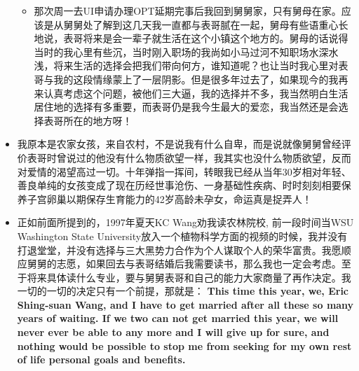 \documentclass[9pt, b5paper]{article}
\begin{document}
\begin{itemize}
\begin{itemize}
\item 那次周一去UI申请办理OPT延期完事后我回到舅舅家，只有舅母在家。应该是从舅舅处了解到这几天我一直都与表哥腻在一起，舅母有些语重心长地说，表哥将来是会一辈子就生活在这个小镇这个地方的。舅母的话说得当时的我心里有些沉，当时刚入职场的我尚如小马过河不知职场水深水浅，将来生活的选择会把我们带向何方，谁知道呢？也让当时我心里对表哥与我的这段情缘蒙上了一层阴影。但是很多年过去了，如果现今的我再来认真考虑这个问题，被他们三大逼，我的选择并不多，我当然明白生活居住地的选择有多重要，而表哥仍是我今生最大的爱恋，我当然还是会选择表哥所在的地方呀！
\end{itemize}
\item 我原本是农家女孩，来自农村，不是说我有什么自卑，而是说就像舅舅曾经评价表哥时曾说过的他没有什么物质欲望一样，我其实也没什么物质欲望，反而对爱情的渴望高过一切。十年弹指一挥间，转眼我已经从当年30岁相对年轻、善良单纯的女孩变成了现在历经世事沧伤、一身基础性疾病、时时刻刻相要保养子宫卵巢以期保存生育能力的42岁高龄未孕女，命运真是捉弄人！

\item 正如前面所提到的，1997年夏天KC Wang劝我读农林院校, 前一段时间当WSU Washington State University放入一个植物科学方面的视频的时候，我并没有打退堂堂，并没有选择与三大黑势力合作为个人谋取个人的荣华富贵。我愿顺应舅舅的志愿，如果回去与表哥结婚后我需要读书，那么我也一定会考虑。至于将来具体读什么专业，要与舅舅表哥和自己的能力大家商量了再作决定。我一切的一切的决定只有一个前提，那就是： \textbf{This time this year, we, Eric Shing-suan Wang, and I have to get married after all these so many years of waiting. If we two can not get married this year, we will never ever be able to any more and I will give up for sure, and nothing would be possible to stop me from seeking for my own rest of life personal goals and benefits.}
\end{itemize}
\end{document}
